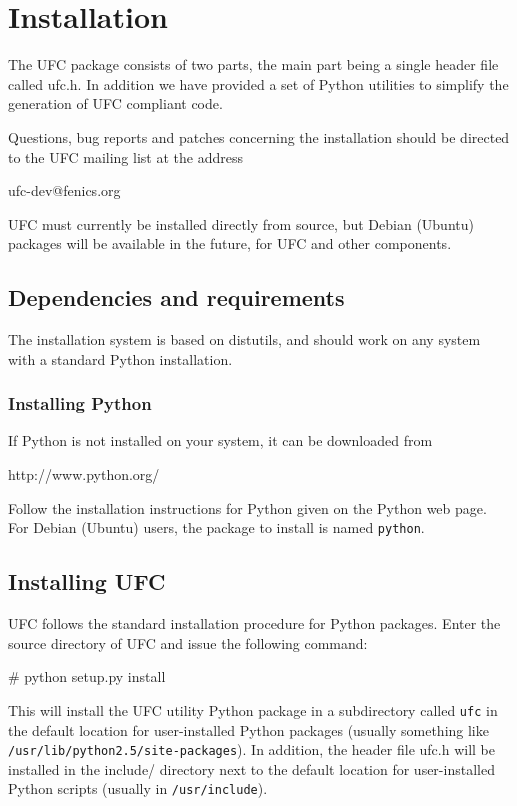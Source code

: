 \chapter{Installation}
\label{app:installation}

\newcommand{\ufc}{UFC}

The \ufc{} package consists of two parts, the main part being a single header file called ufc.h.
In addition we have provided a set of Python utilities to simplify the generation of \ufc{} compliant code.

Questions, bug reports and patches concerning
the installation should be directed to the
\ufc{} mailing list at the address
\begin{code}
ufc-dev@fenics.org
\end{code}

\ufc{} must currently be installed directly from source, but Debian
(Ubuntu) packages will be available in the future, for \ufc{} and
other \fenics{} components.

\section{Dependencies and requirements}

The installation system is based on distutils, and should work on any system with a standard Python installation.

\subsection{Installing Python}

If Python is not installed on your system, it can be downloaded from
\begin{code}
http://www.python.org/
\end{code}
Follow the installation instructions for Python given on the Python web page.
For Debian (Ubuntu) users, the package to install is named \texttt{python}.

\section{Installing \ufc{}}

\ufc{} follows the standard installation procedure for Python
packages. Enter the source directory of \ufc{} and issue the
following command:
\begin{code}
# python setup.py install
\end{code}
This will install the \ufc{} utility Python package in a subdirectory
called \texttt{ufc} in the default location for user-installed Python
packages (usually something like \texttt{/usr/lib/python2.5/site-packages}).
In addition, the header file ufc.h will be
installed in the include/ directory next to the default location for user-installed Python scripts
(usually in \texttt{/usr/include}).

